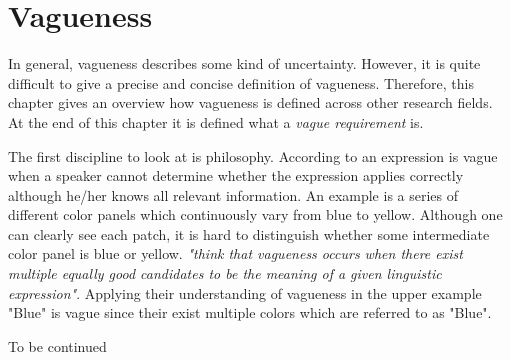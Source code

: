 \section{Vagueness}
\label{chp:fundamentals:sec:vagueness}
In general, vagueness describes some kind of uncertainty.
However, it is quite difficult to give a precise and concise definition of vagueness.
Therefore, this chapter gives an overview how vagueness is defined across other research fields.
At the end of this chapter it is defined what a \textit{vague requirement} is.

The first discipline to look at is philosophy.
According to \textcite{Braun:2007} an expression is vague when a speaker cannot determine whether the expression applies correctly although he/her knows all relevant information.
An example is a series of different color panels which continuously vary from blue to yellow.
Although one can clearly see each patch, it is hard to distinguish whether some intermediate color panel is blue or yellow.
\textcite{Braun:2007} \textit{"think that vagueness occurs when there exist multiple equally good candidates to be the meaning of a given linguistic expression"}.
Applying their understanding of vagueness in the upper example "Blue" is vague since their exist multiple colors which are referred to as "Blue".

To be continued
